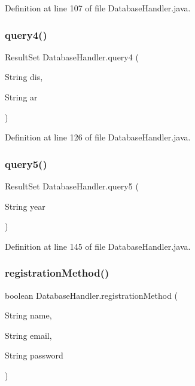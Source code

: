 Definition at line 107 of file Database\+Handler.\+java.

\mbox{\label{class_database_handler_a6dd432cfb64e9579b93da8ca1b1ccff8}} 
\subsubsection{\texorpdfstring{query4()}{query4()}}
{\footnotesize\ttfamily Result\+Set Database\+Handler.\+query4 (\begin{DoxyParamCaption}\item[{String}]{dis,  }\item[{String}]{ar }\end{DoxyParamCaption})}



Definition at line 126 of file Database\+Handler.\+java.

\mbox{\label{class_database_handler_a63a618d22c1241c0d6b7165c1f1a5967}} 
\subsubsection{\texorpdfstring{query5()}{query5()}}
{\footnotesize\ttfamily Result\+Set Database\+Handler.\+query5 (\begin{DoxyParamCaption}\item[{String}]{year }\end{DoxyParamCaption})}



Definition at line 145 of file Database\+Handler.\+java.

\mbox{\label{class_database_handler_af61e1c8fda7f53e1f1a047b1215c740e}} 
\subsubsection{\texorpdfstring{registrationMethod()}{registrationMethod()}}
{\footnotesize\ttfamily boolean Database\+Handler.\+registration\+Method (\begin{DoxyParamCaption}\item[{String}]{name,  }\item[{String}]{email,  }\item[{String}]{password }\end{DoxyParamCaption})}



